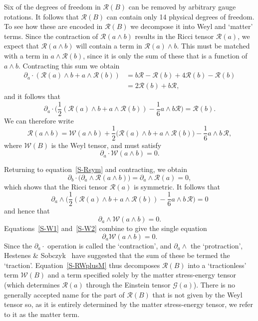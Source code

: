 \documentclass[a4paper]{article}
\numberwithin{equation}{section}
\newcommand{\nn}{\nonumber}
\newcommand{\dt}{\! \cdot \!}
\newcommand{\wdg}{\! \wedge \!}
\newcommand{\half}{{\textstyle \frac{1}{2}}}
\newcommand{\clg}{{\mathcal{G}}}
\newcommand{\clr}{{\mathcal{R}}}
\newcommand{\clw}{{\mathcal{W}}}
\newcommand{\da}{\partial_a}
\newcommand{\db}{\partial_b}
\begin{document}
Six of the degrees of freedom in $\clr(B)$ can be removed by arbitrary
gauge rotations.  It follows that $\clr(B)$ can contain only 14
physical degrees of freedom.  To see how these are encoded in
$\clr(B)$ we decompose it into Weyl and `matter' terms.  Since the
contraction of $\clr(a\wedge b)$ results in the Ricci tensor
$\clr(a)$, we expect that $\clr(a\wdg b)$ will contain a term in
$\clr(a) \wdg b$.  This must be matched with a term in $a \wdg
\clr(b)$, since it is only the sum of these that is a function of
$a\wdg b$.  Contracting this sum we obtain
%
\begin{align}
\da \dt ( \clr(a) \wdg b + a \wdg \clr(b)) 
&= b \clr - \clr(b) + 4 \clr(b) - \clr(b) \nn \\
&= 2 \clr(b) + b \clr,
\end{align}
%
and it follows that
%
\begin{equation}
\da \dt \bigl( \half \left( \clr(a) \wdg b + a \wdg \clr(b) \right) -
{\textstyle \frac{1}{6}} a \wdg b \clr \bigr) = \clr(b).
\end{equation}
%
We can therefore write
%
\begin{equation}
\clr(a \wdg b) = \clw(a \wdg b) + \half \bigl(\clr(a) \wdg b + a \wdg
\clr(b) \bigr) - {\textstyle \frac{1}{6}} a \wdg b \, \clr,
\label{S-RWplusM}
\end{equation}
%
where $\clw(B)$ is the Weyl tensor, and must satisfy
%
\begin{equation}
\da \dt \clw(a \wdg b) = 0.
\label{S-W1}
\end{equation}


Returning to equation~\eqref{S-Rsym} and contracting, we obtain
%
\begin{equation}
\db \dt \bigl( \da \wdg \clr(a \wdg b) \bigr) = \da \wdg \clr(a) = 0, 
\end{equation}
%
which shows that the Ricci tensor $\clr(a)$ is symmetric.  It follows
that
%
\begin{equation}
\da \wdg \bigl( \half ( \clr(a) \wdg b + a \wdg \clr(b)) -
{\textstyle \frac{1}{6}} a \wdg b \, \clr  \bigr) = 0
\end{equation}
%
and hence that
%
\begin{equation}
\da \wdg \clw(a \wdg b) = 0.
\label{S-W2}
\end{equation}
%
Equations~\eqref{S-W1} and~\eqref{S-W2} combine to give the single equation
%
\begin{equation}
\da \clw(a \wdg b) = 0.
\label{S-Wsym}
\end{equation}
%
Since the $\da\cdot$ operation is called the `contraction', and
$\da\wedge$ the `protraction', Hestenes \& Sobczyk~\cite{hes-gc} have
suggested that the sum of these be termed the `traction'.
Equation~\eqref{S-RWplusM} thus decomposes $\clr(B)$ into a `tractionless'
term $\clw(B)$ and a term specified solely by the matter stress-energy
tensor (which determines $\clr(a)$ through the Einstein tensor
$\clg(a)$).  There is no generally accepted name for the part of
$\clr(B)$ that is not given by the Weyl tensor so, as it is entirely
determined by the matter stress-energy tensor, we refer to it as the
matter term.
\end{document}
